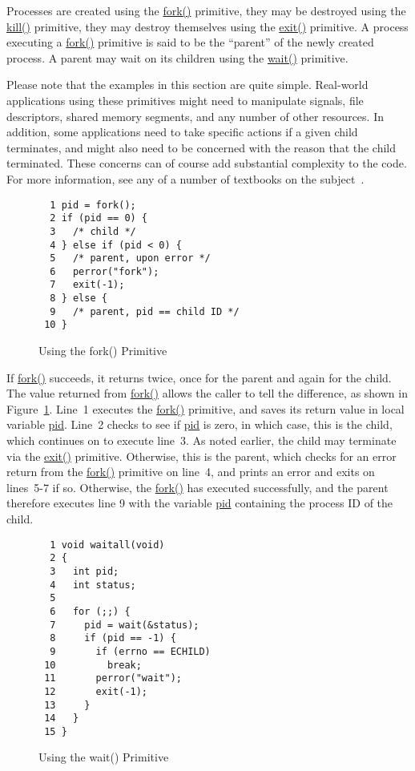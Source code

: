 Processes are created using the \url{fork()} primitive, they may
be destroyed using the \url{kill()} primitive, they may destroy
themselves using the \url{exit()} primitive.
A process executing a \url{fork()} primitive is said to be the ``parent''
of the newly created process.
A parent may wait on its children using the \url{wait()} primitive.

Please note that the examples in this section are quite simple.
Real-world applications using these primitives might need to manipulate
signals, file descriptors, shared memory segments, and any number of
other resources.
In addition, some applications need to take specific actions if a given
child terminates, and might also need to be concerned with the reason
that the child terminated.
These concerns can of course add substantial complexity to the code.
For more information, see any of a number of textbooks on the
subject~\cite{WRichardStevens1992}.

\begin{figure}[tbp]
{ \scriptsize
\begin{verbatim}
  1 pid = fork();
  2 if (pid == 0) {
  3   /* child */
  4 } else if (pid < 0) {
  5   /* parent, upon error */
  6   perror("fork");
  7   exit(-1);
  8 } else {
  9   /* parent, pid == child ID */
 10 }
\end{verbatim}
}
\caption{Using the fork() Primitive}
\label{fig:toolsoftrade:Using the fork() Primitive}
\end{figure}

If \url{fork()} succeeds, it returns twice, once for the parent
and again for the child.
The value returned from \url{fork()} allows the caller to tell
the difference, as shown in
Figure~\ref{fig:toolsoftrade:Using the fork() Primitive}.
Line~1 executes the \url{fork()} primitive, and saves its return value
in local variable \url{pid}.
Line~2 checks to see if \url{pid} is zero, in which case, this is the
child, which continues on to execute line~3.
As noted earlier, the child may terminate via the \url{exit()} primitive.
Otherwise, this is the parent, which checks for an error return from
the \url{fork()} primitive on line~4, and prints an error and exits
on lines~5-7 if so.
Otherwise, the \url{fork()} has executed successfully, and the parent
therefore executes line 9 with the variable \url{pid} containing the
process ID of the child.

\begin{figure}[tbp]
{ \scriptsize
\begin{verbatim}
  1 void waitall(void)
  2 {
  3   int pid;
  4   int status;
  5 
  6   for (;;) {
  7     pid = wait(&status);
  8     if (pid == -1) {
  9       if (errno == ECHILD)
 10         break;
 11       perror("wait");
 12       exit(-1);
 13     }
 14   }
 15 }
\end{verbatim}
}
\caption{Using the wait() Primitive}
\label{fig:toolsoftrade:Using the wait() Primitive}
\end{figure}

